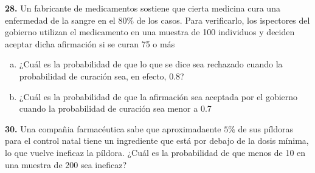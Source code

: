 \documentclass[12pt, letterpaper]{article}
\begin{document}
    \textbf{28. }Un fabricante de medicamentos sostiene que cierta medicina cura una enfermedad de la sangre en el $80\%$
    de los casos. Para verificarlo, los ispectores del gobierno utilizan el medicamento en una muestra de 100 individuos y
    deciden aceptar dicha afirmación si se curan 75 o más
        \begin{enumerate}[a)]
            \item ¿Cuál es la probabilidad de que lo que se dice sea rechazado cuando la probabilidad de curación sea,
                  en efecto, 0.8?
            \item ¿Cuál es la probabilidad de que la afirmación sea aceptada por el gobierno cuando la probabilidad de
                  curación sea menor a 0.7
        \end{enumerate}\vskip1cm

    \textbf{30. }Una compañia farmacéutica sabe que aproximadaente $5\%$ de sus píldoras para el control natal tiene un
    ingrediente que está por debajo de la dosis mínima, lo que vuelve ineficaz la píldora. ¿Cuál es la probabilidad de que
    menos de 10 en una muestra de 200 sea ineficaz?
\end{document}
